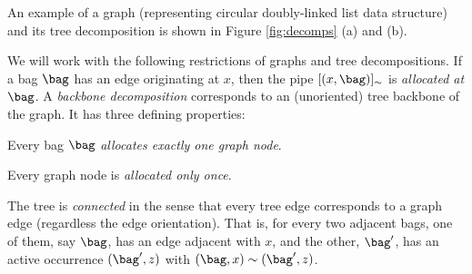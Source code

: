 {An example of a graph (representing circular doubly-linked list data structure) and its tree decomposition is shown in Figure \ref{fig:decomps} (a) and (b).


We will work with the following restrictions of graphs and tree decompositions.
If a bag $\bag$ has an edge originating at $x$, then the pipe $[(x,\bag)]_{\sim}$ is \emph{allocated at $\bag$}.
A \emph{backbone decomposition} corresponds to an (unoriented) tree backbone of the graph. 
It has three defining properties:
\begin{inparaenum}
\item
%
Every bag $\bag$ \emph{allocates exactly one graph node}. %
%
%
\item
Every graph node is \emph{allocated only once}.
\item
The tree is \emph{connected} in the sense that every tree edge corresponds to a graph edge (regardless the edge orientation).
That is, for every two adjacent bags,
one of them, say $\bag$, has an edge adjacent with $x$, and the other, $\bag'$, has an active occurrence $(\bag',z)$ with $(\bag,x)\sim (\bag',z)$.
%
\end{inparaenum}



%

}
